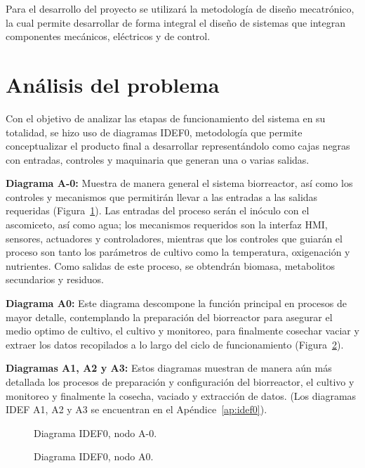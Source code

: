 \documentclass[11pt,tesis,twoside,openright,spanish]{upiiztt}
\begin{document}
Para el desarrollo del proyecto se utilizará la metodología de diseño mecatrónico,
la cual permite desarrollar de forma integral el diseño de sistemas que integran
componentes mecánicos, eléctricos y de control.

\section{Análisis del problema}

Con el objetivo de analizar las etapas de funcionamiento del sistema en su totalidad,
se hizo uso de diagramas IDEF0, metodología que permite conceptualizar el
producto final a desarrollar representándolo como cajas negras con entradas,
controles y maquinaria que generan una o varias salidas.

\textbf{Diagrama A-0:} Muestra de manera general el sistema biorreactor, así como los
controles y mecanismos que permitirán llevar a las entradas a las salidas requeridas
(Figura~\ref{fig:idef0_A0}). Las entradas del proceso serán el inóculo con el ascomiceto, así como
agua; los mecanismos requeridos son la interfaz HMI, sensores, actuadores y
controladores, mientras que los controles que guiarán el proceso son tanto los
parámetros de cultivo como la temperatura, oxigenación y nutrientes. Como salidas
de este proceso, se obtendrán biomasa, metabolitos secundarios y residuos.

\textbf{Diagrama A0:} Este diagrama descompone la función principal en procesos de
mayor detalle, contemplando la preparación del biorreactor para asegurar el medio
optimo de cultivo, el cultivo y monitoreo, para finalmente cosechar vaciar y extraer
los datos recopilados a lo largo del ciclo de funcionamiento (Figura~\ref{fig:idef0_A0b}).

\textbf{Diagramas A1, A2 y A3:} Estos diagramas muestran de manera aún más detallada
los procesos de preparación y configuración del biorreactor, el cultivo y monitoreo
y finalmente la cosecha, vaciado y extracción de datos. (Los diagramas IDEF A1,
A2 y A3 se encuentran en el Apéndice~\ref{ap:idef0}).

\begin{figure}[H]
  \centering
  \caption{Diagrama IDEF0, nodo A-0.}
  \label{fig:idef0_A0}
\end{figure}

\begin{figure}[H]
  \centering
  \caption{Diagrama IDEF0, nodo A0.}
  \label{fig:idef0_A0b}
\end{figure}
\end{document}
